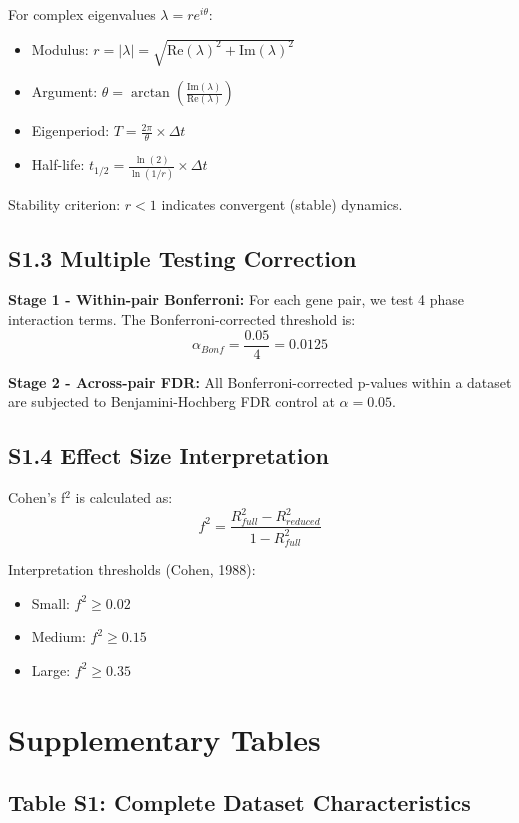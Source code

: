 \documentclass[11pt,a4paper]{article}
\begin{document}
For complex eigenvalues $\lambda = r e^{i\theta}$:
\begin{itemize}
    \item Modulus: $r = |\lambda| = \sqrt{\text{Re}(\lambda)^2 + \text{Im}(\lambda)^2}$
    \item Argument: $\theta = \arctan\left(\frac{\text{Im}(\lambda)}{\text{Re}(\lambda)}\right)$
    \item Eigenperiod: $T = \frac{2\pi}{\theta} \times \Delta t$
    \item Half-life: $t_{1/2} = \frac{\ln(2)}{\ln(1/r)} \times \Delta t$
\end{itemize}

Stability criterion: $r < 1$ indicates convergent (stable) dynamics.

\subsection{S1.3 Multiple Testing Correction}

\textbf{Stage 1 - Within-pair Bonferroni:}
For each gene pair, we test 4 phase interaction terms. The Bonferroni-corrected threshold is:
\[
\alpha_{Bonf} = \frac{0.05}{4} = 0.0125
\]

\textbf{Stage 2 - Across-pair FDR:}
All Bonferroni-corrected p-values within a dataset are subjected to Benjamini-Hochberg FDR control at $\alpha = 0.05$.

\subsection{S1.4 Effect Size Interpretation}

Cohen's f$^2$ is calculated as:
\[
f^2 = \frac{R^2_{full} - R^2_{reduced}}{1 - R^2_{full}}
\]

Interpretation thresholds (Cohen, 1988):
\begin{itemize}
    \item Small: $f^2 \geq 0.02$
    \item Medium: $f^2 \geq 0.15$
    \item Large: $f^2 \geq 0.35$
\end{itemize}

\section{Supplementary Tables}

\subsection{Table S1: Complete Dataset Characteristics}
\end{document}
